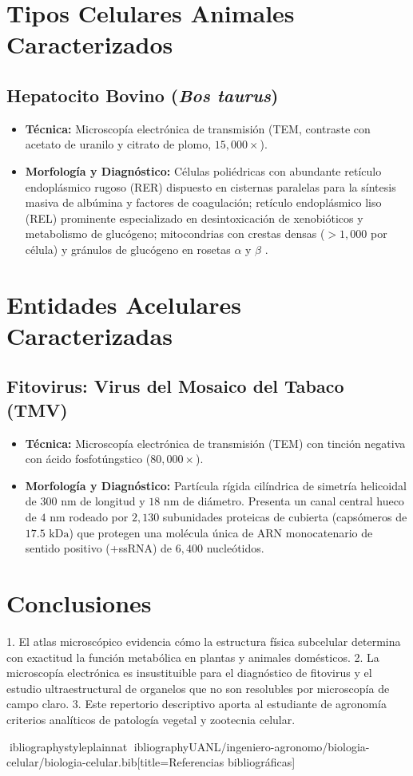 \documentclass[spanish,letterpaper,oneside]{article}
\begin{document}
\section{Tipos Celulares Animales Caracterizados}
\subsection{Hepatocito Bovino (\textit{Bos taurus})}
\begin{itemize}
    \item \textbf{Técnica:} Microscopía electrónica de transmisión (TEM, contraste con acetato de uranilo y citrato de plomo, $15,000\times$).
    \item \textbf{Morfología y Diagnóstico:} Células poliédricas con abundante retículo endoplásmico rugoso (RER) dispuesto en cisternas paralelas para la síntesis masiva de albúmina y factores de coagulación; retículo endoplásmico liso (REL) prominente especializado en desintoxicación de xenobióticos y metabolismo de glucógeno; mitocondrias con crestas densas ($>1,000$ por célula) y gránulos de glucógeno en rosetas $\alpha$ y $\beta$ \parencite{lodish2016}.
\end{itemize}

\section{Entidades Acelulares Caracterizadas}
\subsection{Fitovirus: Virus del Mosaico del Tabaco (TMV)}
\begin{itemize}
    \item \textbf{Técnica:} Microscopía electrónica de transmisión (TEM) con tinción negativa con ácido fosfotúngstico ($80,000\times$).
    \item \textbf{Morfología y Diagnóstico:} Partícula rígida cilíndrica de simetría helicoidal de $300\text{ nm}$ de longitud y $18\text{ nm}$ de diámetro. Presenta un canal central hueco de $4\text{ nm}$ rodeado por $2,130$ subunidades proteicas de cubierta (capsómeros de $17.5\text{ kDa}$) que protegen una molécula única de ARN monocatenario de sentido positivo (+ssRNA) de $6,400$ nucleótidos.
\end{itemize}

\section{Conclusiones}
1. El atlas microscópico evidencia cómo la estructura física subcelular determina con exactitud la función metabólica en plantas y animales domésticos.
2. La microscopía electrónica es insustituible para el diagnóstico de fitovirus y el estudio ultraestructural de organelos que no son resolubles por microscopía de campo claro.
3. Este repertorio descriptivo aporta al estudiante de agronomía criterios analíticos de patología vegetal y zootecnia celular.

\newpage
ibliographystyle{plainnat}
ibliography{UANL/ingeniero-agronomo/biologia-celular/biologia-celular.bib}[title={Referencias bibliográficas}]
\end{document}
